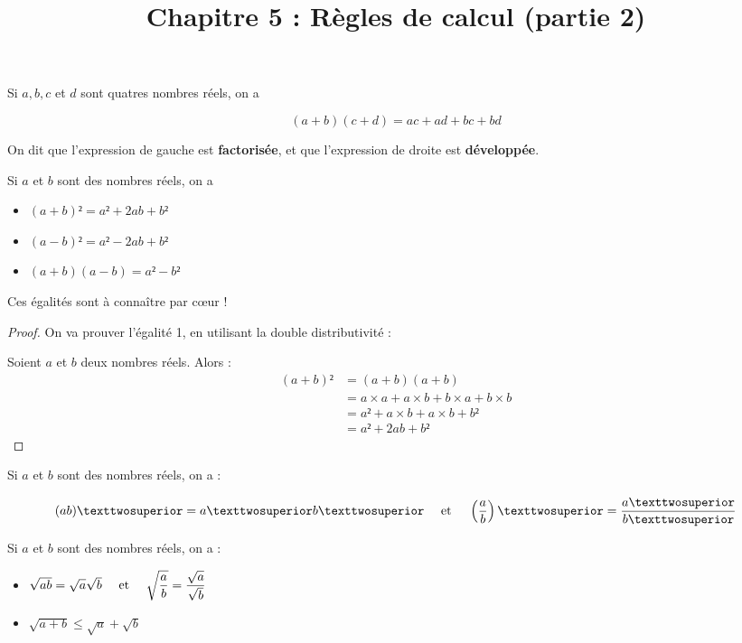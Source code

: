 \documentclass[
	classe=$2^{de}$
]{coursclass}
\title{Chapitre 5 : Règles de calcul (partie 2)}
\author{}
\date{}
\begin{document}
\maketitle

\begin{propriete}
	Si $a, b, c$ et $d$ sont quatres nombres réels, on a

	$$ (a + b)(c + d) = ac + ad + bc + bd $$

	On dit que l'expression de gauche est \textbf{factorisée}, et que l'expression de droite est \textbf{développée}.
\end{propriete}

\begin{propriete}
	Si $a$ et $b$ sont des nombres réels, on a
	\begin{itemize}
		\item $(a + b)² = a² + 2ab + b²$
		\item $(a - b)² = a² - 2ab + b²$
		\item $(a + b)(a - b) = a² - b²$
	\end{itemize}

	Ces égalités sont à connaître par cœur !
\end{propriete}
\begin{proof}
	On va prouver l'égalité 1, en utilisant la double distributivité :

	Soient $a$ et $b$ deux nombres réels. Alors :
	\begin{align*}
		(a + b)² & = (a + b)(a + b)        \\
		         & = a×a + a×b + b×a + b×b \\
		         & = a² + a×b + a×b + b²   \\
		         & = a² + 2ab + b²
	\end{align*}
\end{proof}

\begin{propriete}
	Si $a$ et $b$ sont des nombres réels, on a :

	$$ (ab)² = a²b² \text{\hspace{1em} et \hspace{1em}} \left(\dfrac{a}{b}\right)² = \dfrac{a²}{b²} $$
\end{propriete}

\begin{propriete}
	Si $a$ et $b$ sont des nombres réels, on a :
	\begin{itemize}
		\item $\sqrt{ab} = \sqrt{a}\sqrt{b} \text{\hspace{1em} et \hspace{1em}} \sqrt{\dfrac{a}{b}} = \dfrac{\sqrt{a}}{\sqrt{b}}$
		\item $\sqrt{a + b} ≤ \sqrt{a} + \sqrt{b}$
	\end{itemize}
\end{propriete}
\end{document}
